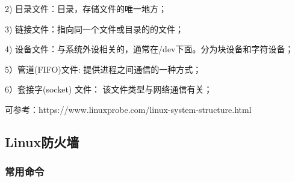 \documentclass[UTF8]{article}%
\begin{document}
2) 目录文件：目录，存储文件的唯一地方；

3) 链接文件：指向同一个文件或目录的的文件；

4) 设备文件：与系统外设相关的，通常在/dev下面。分为块设备和字符设备；

5）管道(FIFO)文件: 提供进程之间通信的一种方式；

6）套接字(socket) 文件： 该文件类型与网络通信有关；

可参考：https://www.linuxprobe.com/linux-system-structure.html

\subsection{Linux防火墙}

\subsubsection{常用命令}
\end{document}
